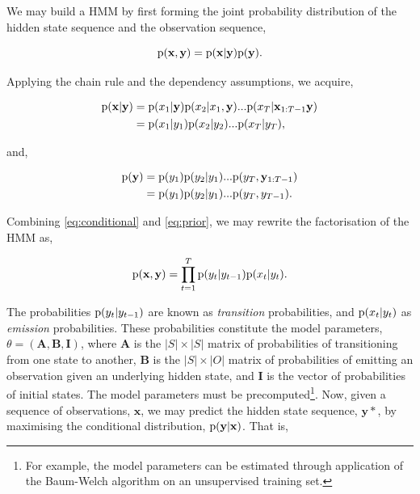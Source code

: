 We may build a HMM by first forming the joint probability distribution of the hidden state sequence and the observation sequence,

\begin{equation}
\text{p}(\mathbf{x}, \mathbf{y}) = \text{p}(\mathbf{x} | \mathbf{y}) \text{p}(\mathbf{y}).
\label{eq:joint}
\end{equation}

Applying the chain rule and the dependency assumptions, we acquire,

\begin{equation}
\begin{aligned}
\text{p}(\mathbf{x} | \mathbf{y}) &= \text{p}(x_1|\mathbf{y}) \text{p}(x_2|x_1, \mathbf{y}) ... \text{p}(x_T|\mathbf{x}_{1:T-1}\mathbf{y}) \\
&= \text{p}(x_1|y_1) \text{p}(x_2|y_2) ... \text{p}(x_T|y_T),
\end{aligned}
\label{eq:conditional}
\end{equation}

and,

\begin{equation}
\begin{aligned}
\text{p}(\mathbf{y}) &= \text{p}(y_1) \text{p}(y_2|y_1) ... \text{p}(y_T, \mathbf{y}_{1:T-1}) \\
&= \text{p}(y_1) \text{p}(y_2|y_1) ... \text{p}(y_T, y_{T-1}).
\end{aligned}
\label{eq:prior}
\end{equation}

Combining \ref{eq:conditional} and \ref{eq:prior}, we may rewrite the factorisation of the HMM as,

\begin{equation}
\text{p}(\mathbf{x}, \mathbf{y}) = \prod_{t=1}^T \text{p}(y_t | y_{t-1})\text{p}(x_t | y_t).
\label{eq:factorisedHMM}
\end{equation}

The probabilities $\text{p}(y_t | y_{t-1})$ are known as \emph{transition} probabilities, and $\text{p}(x_t | y_t) $ as \emph{emission} probabilities. These probabilities constitute the model parameters, $\theta = (\mathbf{A}, \mathbf{B}, \mathbf{I})$, where $\mathbf{A}$ is the $|S| \times |S|$ matrix of probabilities of transitioning from one state to another, $\mathbf{B}$ is the $|S| \times |O|$ matrix of probabilities of emitting an observation given an underlying hidden state, and $\mathbf{I}$ is the vector of probabilities of initial states. The model parameters must be precomputed\footnote{For example, the model parameters can be estimated through application of the Baum-Welch algorithm on an unsupervised training set.}. Now, given a sequence of observations, $\textbf{x}$, we may predict the hidden state sequence, $\mathbf{y}*$, by maximising the conditional distribution, $\text{p}(\mathbf{y} | \mathbf{x})$. That is,

